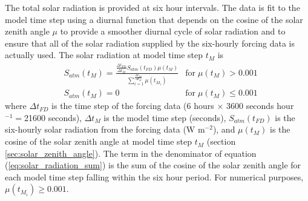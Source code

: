 \documentclass[12pt,authoryear]{elsarticle}
\numberwithin{equation}{section} %
\begin{document}
The total solar radiation is provided at six hour intervals. The data is fit to the model time step using a diurnal function that depends on the cosine of the solar zenith angle $\mu$ to provide a smoother diurnal cycle of solar radiation and to ensure that all of the solar radiation supplied by the six-hourly forcing data is actually used. The solar radiation at model time step $t_{M}$ is 
\begin{equation}
\label{eq:solar_radiation_sum}
\begin{aligned}
& S_{atm}(t_{M})=\frac{\frac{\Delta t_{FD}}{\Delta t_{M}}S_{atm}(t_{FD})\mu(t_{M})}{\sum\limits_{i=1}^{\frac{\Delta t_{FD}}{\Delta t_{M}}}\mu(t_{M_{i}})} & \textrm{for}\; \mu(t_{M})>0.001 \\
& S_{atm}(t_{M})=0 & \textrm{for}\; \mu(t_{M})\leq 0.001
\end{aligned}
\end{equation}
where $\Delta t_{FD}$ is the time step of the forcing data (6 hours $\times$ 3600 seconds hour$^{-1}=$21600 seconds), $\Delta t_{M}$ is the model time step (seconds), $S_{atm}(t_{FD})$ is the six-hourly solar radiation from the forcing data (W m$^{-2}$), and $\mu(t_{M})$ is the cosine of the solar zenith angle at model time step $t_{M}$ (section \ref{sec:solar_zenith_angle}). The term in the denominator of equation (\ref{eq:solar_radiation_sum}) is the sum of the cosine of the solar zenith angle for each model time step falling within the six hour period. For numerical purposes, $\mu(t_{M_{i}})\geq0.001$.
\end{document}

